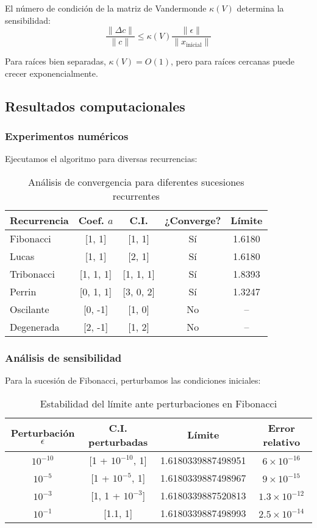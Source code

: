 \documentclass[12pt]{article}
\begin{document}
El número de condición de la matriz de Vandermonde $\kappa(V)$ determina la sensibilidad:
\[
\frac{\|\Delta c\|}{\|c\|} \leq \kappa(V) \frac{\|\epsilon\|}{\|x_{\text{inicial}}\|}
\]

Para raíces bien separadas, $\kappa(V) = O(1)$, pero para raíces cercanas puede crecer exponencialmente.

\subsection{Resultados computacionales}

\subsubsection{Experimentos numéricos}

Ejecutamos el algoritmo para diversas recurrencias:

\begin{table}[h]
\centering
\begin{tabular}{|l|c|c|c|c|}
\hline
\textbf{Recurrencia} & \textbf{Coef. $a$} & \textbf{C.I.} & \textbf{¿Converge?} & \textbf{Límite} \\
\hline
Fibonacci & [1, 1] & [1, 1] & Sí & 1.6180 \\
Lucas & [1, 1] & [2, 1] & Sí & 1.6180 \\
Tribonacci & [1, 1, 1] & [1, 1, 1] & Sí & 1.8393 \\
Perrin & [0, 1, 1] & [3, 0, 2] & Sí & 1.3247 \\
Oscilante & [0, -1] & [1, 0] & No & -- \\
Degenerada & [2, -1] & [1, 2] & No & -- \\
\hline
\end{tabular}
\caption{Análisis de convergencia para diferentes sucesiones recurrentes}
\end{table}

\subsubsection{Análisis de sensibilidad}

Para la sucesión de Fibonacci, perturbamos las condiciones iniciales:

\begin{table}[h]
\centering
\begin{tabular}{|c|c|c|c|}
\hline
\textbf{Perturbación $\epsilon$} & \textbf{C.I. perturbadas} & \textbf{Límite} & \textbf{Error relativo} \\
\hline
$10^{-10}$ & [1 + $10^{-10}$, 1] & 1.6180339887498951 & $6 \times 10^{-16}$ \\
$10^{-5}$ & [1 + $10^{-5}$, 1] & 1.6180339887498967 & $9 \times 10^{-15}$ \\
$10^{-3}$ & [1, 1 + $10^{-3}$] & 1.6180339887520813 & $1.3 \times 10^{-12}$ \\
$10^{-1}$ & [1.1, 1] & 1.6180339887498993 & $2.5 \times 10^{-14}$ \\
\hline
\end{tabular}
\caption{Estabilidad del límite ante perturbaciones en Fibonacci}
\end{table}
\end{document}
